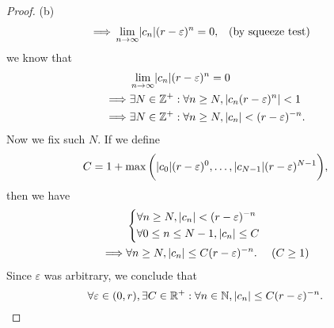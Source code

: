 \begin{proof}{(b)}
\begin{align*}
    \implies & \lim_{n \to \infty} \abs{c_n} (r - \varepsilon)^n = 0,                                      &  & \text{(by squeeze test)}
  \end{align*}
  we know that
  \begin{align*}
             & \lim_{n \to \infty} \abs{c_n} (r - \varepsilon)^n = 0                      \\
    \implies & \exists N \in \Z^+ : \forall n \geq N, \abs{c_n (r - \varepsilon)^n} < 1   \\
    \implies & \exists N \in \Z^+ : \forall n \geq N, \abs{c_n} < (r - \varepsilon)^{-n}.
  \end{align*}
  Now we fix such \(N\).
  If we define
  \[
    C = 1 + \max\bigg(\abs{c_0} (r - \varepsilon)^0, \dots, \abs{c_{N - 1}} (r - \varepsilon)^{N - 1}\bigg),
  \]
  then we have
  \begin{align*}
             & \begin{dcases}
                 \forall n \geq N, \left\lvert c_n\right\rvert < (r - \varepsilon)^{-n} \\
                 \forall 0 \leq n \leq N - 1, \left\lvert c_n\right\rvert \leq C
               \end{dcases}                    \\
    \implies & \forall n \geq N, \left\lvert c_n\right\rvert \leq C (r - \varepsilon)^{-n}. & (C \geq 1)
  \end{align*}
  Since \(\varepsilon\) was arbitrary, we conclude that
  \[
    \forall \varepsilon \in (0, r), \exists C \in \mathbb{R}^+ : \forall n \in \mathbb{N}, \left\lvert c_n\right\rvert \leq C (r - \varepsilon)^{-n}.
  \]
\end{proof}

